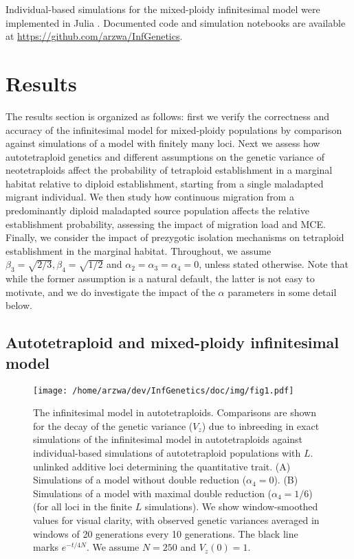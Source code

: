 \documentclass[12pt,a4paper]{article}
\begin{document}
    Individual-based simulations for the mixed-ploidy infinitesimal model were
    implemented in Julia \citep{julia}.
    Documented code and simulation notebooks are available at
    \url{https://github.com/arzwa/InfGenetics}.


\section*{Results}

The results section is organized as follows: first we verify the correctness
and accuracy of the infinitesimal model for mixed-ploidy populations by
comparison against simulations of a model with finitely many loci.
Next we assess how autotetraploid genetics and different assumptions on the
genetic variance of neotetraploids affect the probability of tetraploid
establishment in a marginal habitat relative to diploid establishment, starting
from a single maladapted migrant individual.
We then study how continuous migration from a predominantly diploid maladapted
source population affects the relative establishment probability, assessing the
impact of migration load and MCE.
Finally, we consider the impact of prezygotic isolation mechanisms on
tetraploid establishment in the marginal habitat.
Throughout, we assume $\beta_3 = \sqrt{2/3}, \beta_4=\sqrt{1/2}$
and $\alpha_2 = \alpha_3 = \alpha_4 = 0$, unless stated otherwise.
Note that while the former assumption is a natural default, the latter is not
easy to motivate, and we do investigate the impact of the $\alpha$ parameters
in some detail below.

\subsection*{Autotetraploid and mixed-ploidy infinitesimal model}

\begin{figure}[t]
\centering
\texttt{[image: /home/arzwa/dev/InfGenetics/doc/img/fig1.pdf]}
\caption{
The infinitesimal model in autotetraploids.
Comparisons are shown for the decay of the genetic variance ($V_z$) due to
inbreeding in exact simulations of the infinitesimal model in autotetraploids
against individual-based simulations of autotetraploid populations with $L$.
unlinked additive loci determining the quantitative trait. 
(A) Simulations of a model without double reduction ($\alpha_4=0$).
(B) Simulations of a model with maximal double reduction ($\alpha_4=1/6$) (for
all loci in the finite $L$ simulations).
We show window-smoothed values for visual clarity, with observed genetic
variances averaged in windows of 20 generations every 10 generations.
The black line marks $e^{-t/4N}$. 
We assume $N=250$ and $V_z(0) = 1$.
\label{fig:vztet}}
\end{figure}
\end{document}
